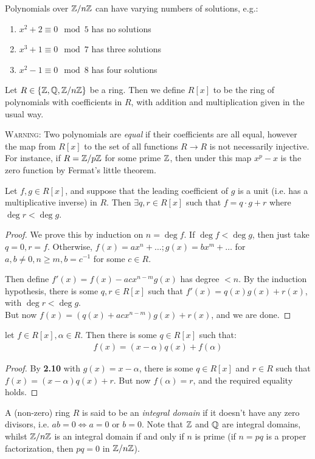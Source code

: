 \documentclass[10pt,a4paper]{article}
\begin{document}
Polynomials over $\mathbb{Z}/n\mathbb{Z}$ can have varying numbers of solutions, e.g.:
\begin{enumerate}
\item $x^2+2 \equiv 0 \mod 5$ has no solutions
\item $x^3 + 1 \equiv 0 \mod 7$ has three solutions
\item $x^2-1 \equiv 0 \mod 8$ has four solutions
\end{enumerate}

Let $R \in \{\mathbb{Z}, \mathbb{Q}, \mathbb{Z}/n\mathbb{Z}\}$ be a ring. Then we define $R[x]$ to be the ring of polynomials with coefficients in $R$, with addition and multiplication given in the usual way.

\textsc{Warning:} Two polynomials are \emph{equal} if their coefficients are all equal, however the map from $R[x]$ to the set of all functions $R\rightarrow R$ is not necessarily injective. For instance, if $R=\mathbb{Z}/p\mathbb{Z}$ for some prime $\mathbb{Z}$, then under this map $x^p-x$ is the zero function by Fermat's little theorem.

\begin{theorem}
Let $f, g \in R[x]$, and suppose that the leading coefficient of $g$ is a unit (i.e. has a multiplicative inverse) in $R$. Then $\exists q, r \in R[x]$ such that $f = q\cdot g + r$ where $\deg r < \deg g$.
\end{theorem}
\begin{proof}
We prove this by induction on $n=\deg f$. If $\deg f < \deg g$, then just take $q = 0, r = f$. Otherwise, $f(x) = ax^n + \ldots; g(x) = bx^m + \ldots$ for $a, b\neq 0, n\geq m, b=c^{-1}$ for some $c\in R$.

Then define $f'(x) = f(x) - acx^{n-m}g(x)$ has degree $< n$. By the induction hypothesis, there is some $q, r \in R[x]$ such that $f'(x) = q(x)g(x) + r(x)$, with $\deg r < \deg g$.\\
But now $f(x) = (q(x) + acx^{n-m}) g(x) + r(x)$, and we are done.
\end{proof}

\begin{theorem}
let $f\in R[x], \alpha \in R$. Then there is some $q \in R[x]$ such that:
\begin{align*}
f(x) = (x-\alpha)q(x) + f(\alpha)
\end{align*}
\end{theorem}
\begin{proof}
By \textbf{2.10} with $g(x) = x-\alpha$, there is some $q \in R[x]$ and $r \in R$ such that $f(x) = (x-\alpha)q(x) + r$. But now $f(\alpha) = r$, and the required equality holds.
\end{proof}
A (non-zero) ring $R$ is said to be an \emph{integral domain} if it doesn't have any zero divisors, i.e. $ab=0 \iff a=0 \text{ or } b=0$. Note that $\mathbb{Z}$ and $\mathbb{Q}$ are integral domains, whilst $\mathbb{Z}/n\mathbb{Z}$ is an integral domain if and only if $n$ is prime (if $n=pq$ is a proper factorization, then $pq = 0$ in $\mathbb{Z}/n\mathbb{Z}$).
\end{document}
